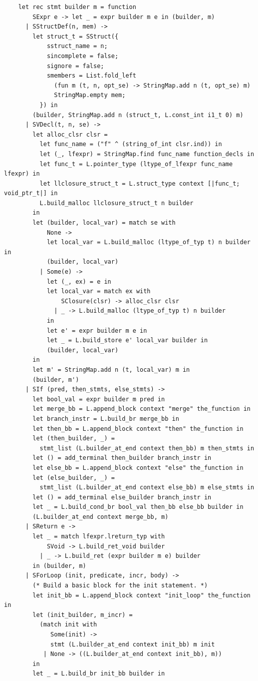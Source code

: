 \documentclass[12pt]{article}
\begin{document}
\begin{mdframed}[hidealllines=true,backgroundcolor=blue!20]
\begin{lstlisting}
    let rec stmt builder m = function
        SExpr e -> let _ = expr builder m e in (builder, m)
      | SStructDef(n, mem) ->
        let struct_t = SStruct({
            sstruct_name = n;
            sincomplete = false;
            signore = false;
            smembers = List.fold_left 
              (fun m (t, n, opt_se) -> StringMap.add n (t, opt_se) m) 
              StringMap.empty mem;
          }) in
        (builder, StringMap.add n (struct_t, L.const_int i1_t 0) m)
      | SVDecl(t, n, se) ->
        let alloc_clsr clsr =
          let func_name = ("f" ^ (string_of_int clsr.ind)) in
          let (_, lfexpr) = StringMap.find func_name function_decls in
          let func_t = L.pointer_type (ltype_of_lfexpr func_name lfexpr) in
          let llclosure_struct_t = L.struct_type context [|func_t; void_ptr_t|] in
          L.build_malloc llclosure_struct_t n builder
        in
        let (builder, local_var) = match se with
            None -> 
            let local_var = L.build_malloc (ltype_of_typ t) n builder in
            (builder, local_var)
          | Some(e) -> 
            let (_, ex) = e in
            let local_var = match ex with
                SClosure(clsr) -> alloc_clsr clsr
              | _ -> L.build_malloc (ltype_of_typ t) n builder
            in
            let e' = expr builder m e in
            let _ = L.build_store e' local_var builder in
            (builder, local_var)
        in
        let m' = StringMap.add n (t, local_var) m in
        (builder, m')
      | SIf (pred, then_stmts, else_stmts) ->
        let bool_val = expr builder m pred in
        let merge_bb = L.append_block context "merge" the_function in
        let branch_instr = L.build_br merge_bb in
        let then_bb = L.append_block context "then" the_function in
        let (then_builder, _) = 
          stmt_list (L.builder_at_end context then_bb) m then_stmts in
        let () = add_terminal then_builder branch_instr in
        let else_bb = L.append_block context "else" the_function in
        let (else_builder, _) = 
          stmt_list (L.builder_at_end context else_bb) m else_stmts in
        let () = add_terminal else_builder branch_instr in
        let _ = L.build_cond_br bool_val then_bb else_bb builder in
        (L.builder_at_end context merge_bb, m)
      | SReturn e ->
        let _ = match lfexpr.lreturn_typ with
            SVoid -> L.build_ret_void builder
          | _ -> L.build_ret (expr builder m e) builder
        in (builder, m)
      | SForLoop (init, predicate, incr, body) ->
        (* Build a basic block for the init statement. *)
        let init_bb = L.append_block context "init_loop" the_function in
        let (init_builder, m_incr) = 
          (match init with 
             Some(init) -> 
             stmt (L.builder_at_end context init_bb) m init
           | None -> ((L.builder_at_end context init_bb), m)) 
        in 
        let _ = L.build_br init_bb builder in        


\end{lstlisting}
\end{mdframed}
\end{document}
